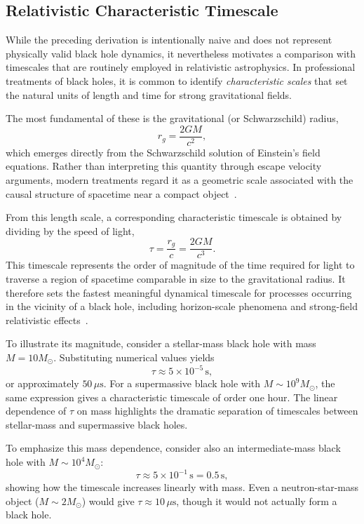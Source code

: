 \documentclass[12pt,a4paper]{article}
\begin{document}
\subsection{Relativistic Characteristic Timescale}

While the preceding derivation is intentionally naive and does not represent
physically valid black hole dynamics, it nevertheless motivates a comparison
with timescales that are routinely employed in relativistic astrophysics.
In professional treatments of black holes, it is common to identify
\emph{characteristic scales} that set the natural units of length and time
for strong gravitational fields.

The most fundamental of these is the gravitational (or Schwarzschild) radius,
\[
r_g = \frac{2GM}{c^2},
\]
which emerges directly from the Schwarzschild solution of Einstein's field
equations. Rather than interpreting this quantity through escape velocity
arguments, modern treatments regard it as a geometric scale associated with
the causal structure of spacetime near a compact object~\cite{bambi2017, carlip2004}.

From this length scale, a corresponding characteristic timescale is obtained
by dividing by the speed of light,
\[
\tau = \frac{r_g}{c} = \frac{2GM}{c^3}.
\]
This timescale represents the order of magnitude of the time required for
light to traverse a region of spacetime comparable in size to the gravitational
radius. It therefore sets the fastest meaningful dynamical timescale for
processes occurring in the vicinity of a black hole, including horizon-scale
phenomena and strong-field relativistic effects~\cite{thorne1986, bambi2017}.

To illustrate its magnitude, consider a stellar-mass black hole with mass
$M = 10 M_\odot$. Substituting numerical values yields
\[
\tau \approx 5 \times 10^{-5}\,\text{s},
\]
or approximately $50\,\mu\text{s}$. For a supermassive black hole with
$M \sim 10^9 M_\odot$, the same expression gives a characteristic timescale of
order one hour. The linear dependence of $\tau$ on mass highlights the dramatic
separation of timescales between stellar-mass and supermassive black holes.

To emphasize this mass dependence, consider also an intermediate-mass black hole with $M \sim 10^4 M_\odot$:
\[
\tau \approx 5 \times 10^{-1}\,\text{s} = 0.5\,\text{s},
\]
showing how the timescale increases linearly with mass. Even a neutron-star-mass object ($M \sim 2 M_\odot$) would give $\tau \approx 10\,\mu\text{s}$, though it would not actually form a black hole.
\end{document}
